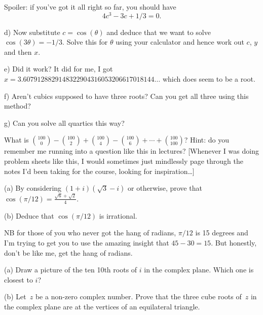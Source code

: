 \documentclass[10pt]{article}
\begin{document}
Spoiler: if you've got it all right so far, you should have
$$4c^3 - 3c + 1/3=0.$$

d) Now substitute $c=\cos(\theta)$ and deduce that we want to solve $\cos(3\theta)=-1/3$. Solve this for $\theta$ using your calculator and hence work out $c$, $y$ and then $x$.

e) Did it work? It did for me, I got $x=3.6079128829148322904316053206617018144\ldots$ which does seem to be a root.

f) Aren't cubics supposed to have three roots? Can you get all three using this method?

g) Can you solve all quartics this way?

\medskip{} What is $\binom{100}{0}-\binom{100}{2}+\binom{100}{4}-\binom{100}{6}+\cdots+\binom{100}{100}$? Hint: do you remember me running into
a question like this in lectures? [Whenever I was doing problem sheets like this, I would sometimes just mindlessly page through the notes I'd been taking for the course, looking for inspiration\ldots]

\medskip{} 

(a) By considering $(1+i)(\sqrt{3}-i)$ or otherwise, prove that $\cos(\pi/12)=\frac{\sqrt{6}+\sqrt{2}}{4}$. 

(b) Deduce that $\cos(\pi/12)$ is irrational. 

NB for those of you who never got the hang of radians, $\pi/12$ is 15 degrees and I'm trying to get you to use the amazing insight that $45-30=15$. But honestly, don't be like me, get the hang of radians.

\medskip{} (a) Draw a picture of the ten 10th roots of $i$ in the complex plane. Which one is closest to $i$?

(b) Let~$z$ be a non-zero complex number. Prove that the three cube roots of~$z$ in the complex plane are at the vertices of an equilateral triangle.
\end{document}

